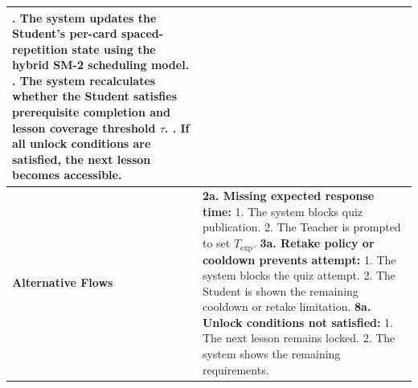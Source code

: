 \begin{longtable}{|>{\raggedright\arraybackslash}p{}|>{\raggedright\arraybackslash}p{}|}
7. The system updates the Student's per-card spaced-repetition state using the hybrid SM-2 scheduling model. \newline
8. The system recalculates whether the Student satisfies prerequisite completion and lesson coverage threshold $\tau$. \newline
9. If all unlock conditions are satisfied, the next lesson becomes accessible. \\ \hline
\textbf{Alternative Flows} &
\textbf{2a. Missing expected response time:} \newline
\hspace*{1em}1. The system blocks quiz publication. \newline
\hspace*{1em}2. The Teacher is prompted to set $T_{\text{exp}}$. \newline
\textbf{3a. Retake policy or cooldown prevents attempt:} \newline
\hspace*{1em}1. The system blocks the quiz attempt. \newline
\hspace*{1em}2. The Student is shown the remaining cooldown or retake limitation. \newline
\textbf{8a. Unlock conditions not satisfied:} \newline
\hspace*{1em}1. The next lesson remains locked. \newline
\hspace*{1em}2. The system shows the remaining requirements. \\
\end{longtable}

